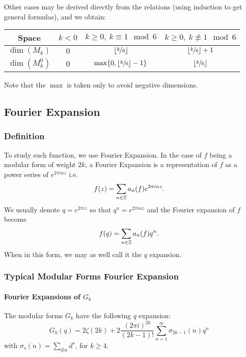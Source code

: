 Other cases may be derived directly from the relations (using induction to get general formulas), and we obtain:

\begin{center}
\begin{tabular}{||c||c|c|c||} 
    \hline
    Space & $k<0$ & $k \geq 0, \ k \equiv 1 \mod 6$ & $k \geq 0, \ k \not \equiv 1 \mod 6$ \\
    \hline
    \hline
    $\dim(M_k)$ & $0$ & $\lfloor \nicefrac{k}{6} \rfloor$ & $\lfloor \nicefrac{k}{6} \rfloor + 1$ \\
    \hline
    $\dim(M_k^0)$ & $0$ & $\max\{0, \lfloor \nicefrac{k}{6} \rfloor - 1\}$ & $\lfloor \nicefrac{k}{6} \rfloor$ \\
    \hline
\end{tabular}
\end{center}
Note that the $\max$ is taken only to avoid negative dimensions.



\subsection{Fourier Expansion}
\subsubsection{Definition}
To study such function, we use Fourier Expansion.
In the case of $f$ being a modular form of weight $2k$, 
a Fourier Expansion is a representation of $f$ as a power series of $e^{2\pi i n z}$
i.e. $$f(z) = \sum_{n \in \mathbb{Z}} a_n(f) e^{2\pi inz}.$$
We usually denote $q = e^{2\pi i z}$ so that $q^n = e^{2\pi i n z}$ 
and the Fourier expansion of $f$ become 
$$
f(q) = \sum_{n \in \mathbb{Z}} a_n(f) q^n.
$$
When in this form, we may as well call it the $q$ expansion.

\subsubsection{Typical Modular Forms Fourier Expansion}
\paragraph{Fourier Expansions of $G_k$}
The modular forms $G_k$ have the following $q$ expansion\cite[p.92]{CourseInArithmetic}:
$$
G_k(q) = 2\zeta(2k) + 2 \frac{{(2 \pi i)}^{2k}}{(2k-1)!} \sum_{n=1}^{\infty} \sigma_{2k-1}(n)q^n
$$
with $\sigma_{s}(n) = \sum_{d | n} d^s$, for $k \geq 4$.

